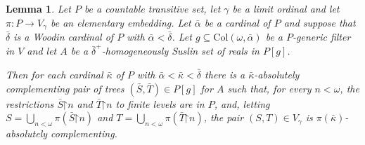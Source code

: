 \documentclass[fleqn, 11pt]{amsart}
\theoremstyle{plain}
\newtheorem{lem}[thm]{Lemma} \newtheorem*{lem*}{Lemma}
\theoremstyle{definition}
\theoremstyle{remark}
\newcommand{\Col}{\mathrm{Col}}
\newcommand{\restrict}{\mathord{\restriction}}
\begin{document}
\begin{lem}\label{lem-map-ub-sets-up-no-strong}
 Let $P$ be a countable transitive set, let $\gamma$ be a limit ordinal and let $\pi \colon P \to V_{\gamma}$ be an elementary embedding. Let $\bar{\alpha}$ be a cardinal of $P$ and suppose that $\bar{\delta}$ is a Woodin cardinal of $P$ with $\bar{\alpha} < \bar{\delta}$. Let $g \subseteq \Col(\omega,\bar{\alpha})$ be a $P$-generic filter in $V$ and let $A$ be a $\bar{\delta}^+$-homogeneously Suslin set of reals in $P[g]$.
 


 Then for each cardinal $\bar{\kappa}$ of $P$ with $\bar{\alpha} < \bar{\kappa} < \bar{\delta}$ there is a $\bar{\kappa}$-absolutely complementing pair of trees $(\bar{S},\bar{T}) \in P[g]$ for $A$ such that, for every $n < \omega$, the restrictions $\bar{S}\restrict n$ and $\bar{T} \restrict n$ to finite levels are in $P$, and, letting $S = \bigcup_{n<\omega} \pi(\bar{S}\restrict n)$ and $T = \bigcup_{n<\omega} \pi(\bar{T}\restrict n)$, the pair $(S,T) \in V_{\gamma}$ is $\pi(\bar{\kappa})$-absolutely complementing.
\end{lem}
\end{document}
